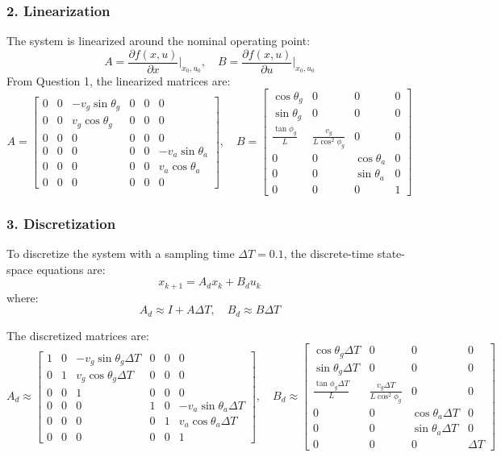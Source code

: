 \subsubsection*{2. Linearization}
The system is linearized around the nominal operating point:
\[
A = \frac{\partial f(x, u)}{\partial x} \bigg|_{x_0, u_0}, \quad
B = \frac{\partial f(x, u)}{\partial u} \bigg|_{x_0, u_0}
\]
From Question 1, the linearized matrices are:
\[
A =
\begin{bmatrix}
0 & 0 & -v_g \sin\theta_g & 0 & 0 & 0 \\
0 & 0 & v_g \cos\theta_g & 0 & 0 & 0 \\
0 & 0 & 0 & 0 & 0 & 0 \\
0 & 0 & 0 & 0 & 0 & -v_a \sin\theta_a \\
0 & 0 & 0 & 0 & 0 & v_a \cos\theta_a \\
0 & 0 & 0 & 0 & 0 & 0
\end{bmatrix}, \quad
B =
\begin{bmatrix}
\cos\theta_g & 0 & 0 & 0 \\
\sin\theta_g & 0 & 0 & 0 \\
\frac{\tan\phi_g}{L} & \frac{v_g}{L \cos^2\phi_g} & 0 & 0 \\
0 & 0 & \cos\theta_a & 0 \\
0 & 0 & \sin\theta_a & 0 \\
0 & 0 & 0 & 1
\end{bmatrix}
\]

\subsubsection*{3. Discretization}
To discretize the system with a sampling time \( \Delta T = 0.1 \), the discrete-time state-space equations are:
\[
x_{k+1} = A_d x_k + B_d u_k
\]
where:
\[
A_d \approx I + A \Delta T, \quad B_d \approx B \Delta T
\]

\noindent The discretized matrices are:
\[
A_d \approx
\begin{bmatrix}
1 & 0 & -v_g \sin\theta_g \Delta T & 0 & 0 & 0 \\
0 & 1 & v_g \cos\theta_g \Delta T & 0 & 0 & 0 \\
0 & 0 & 1 & 0 & 0 & 0 \\
0 & 0 & 0 & 1 & 0 & -v_a \sin\theta_a \Delta T \\
0 & 0 & 0 & 0 & 1 & v_a \cos\theta_a \Delta T \\
0 & 0 & 0 & 0 & 0 & 1
\end{bmatrix}, \quad
B_d \approx
\begin{bmatrix}
\cos\theta_g \Delta T & 0 & 0 & 0 \\
\sin\theta_g \Delta T & 0 & 0 & 0 \\
\frac{\tan\phi_g \Delta T}{L} & \frac{v_g \Delta T}{L \cos^2\phi_g} & 0 & 0 \\
0 & 0 & \cos\theta_a \Delta T & 0 \\
0 & 0 & \sin\theta_a \Delta T & 0 \\
0 & 0 & 0 & \Delta T
\end{bmatrix}
\]

